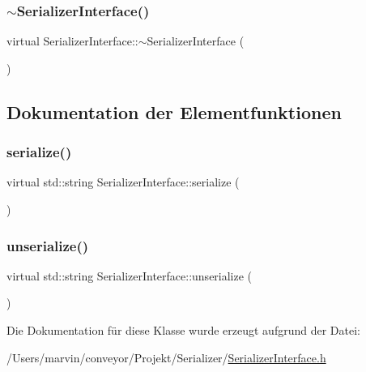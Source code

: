 \subsubsection{\texorpdfstring{$\sim$\+Serializer\+Interface()}{~SerializerInterface()}}
{\footnotesize\ttfamily virtual Serializer\+Interface\+::$\sim$\+Serializer\+Interface (\begin{DoxyParamCaption}{ }\end{DoxyParamCaption})\hspace{0.3cm}{\ttfamily [virtual]}}



\subsection{Dokumentation der Elementfunktionen}
\hypertarget{class_serializer_interface_a7ca657af272daca5396afd0c53f845a5}{}\label{class_serializer_interface_a7ca657af272daca5396afd0c53f845a5} 
\subsubsection{\texorpdfstring{serialize()}{serialize()}}
{\footnotesize\ttfamily virtual std\+::string Serializer\+Interface\+::serialize (\begin{DoxyParamCaption}{ }\end{DoxyParamCaption})\hspace{0.3cm}{\ttfamily [pure virtual]}}

\hypertarget{class_serializer_interface_a0d3718721a1b03be94e5b3efb09c9f7b}{}\label{class_serializer_interface_a0d3718721a1b03be94e5b3efb09c9f7b} 
\subsubsection{\texorpdfstring{unserialize()}{unserialize()}}
{\footnotesize\ttfamily virtual std\+::string Serializer\+Interface\+::unserialize (\begin{DoxyParamCaption}{ }\end{DoxyParamCaption})\hspace{0.3cm}{\ttfamily [pure virtual]}}



Die Dokumentation für diese Klasse wurde erzeugt aufgrund der Datei\+:\begin{DoxyCompactItemize}
\item 
/\+Users/marvin/conveyor/\+Projekt/\+Serializer/\hyperlink{_serializer_interface_8h}{Serializer\+Interface.\+h}\end{DoxyCompactItemize}
